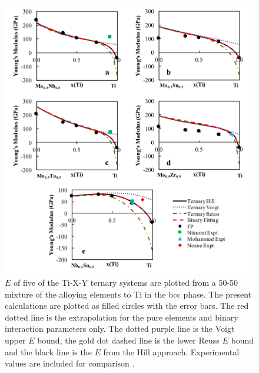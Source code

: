 \pagebreak
\begin{figure}[H]
	\centering
	\includegraphics[width=\textwidth]{Chapter-6/Figures/tixyyoungs1.png}
	\caption{$E$ of five of the Ti-X-Y ternary systems are plotted from a 50-50 mixture of the alloying elements to Ti in the bcc phase. The present calculations are plotted as filled circles with the error bars. The red dotted line is the extrapolation for the pure elements and binary interaction parameters only. The dotted purple line is the Voigt upper $E$ bound, the gold dot dashed line is the lower Reuss $E$ bound and the black line is the $E$ from the Hill approach. Experimental values are included for comparison \cite{Niinomi2012,Mohammed2014,Nozoe2007,Geetha2009}.}
	\label{Ch6-figure:tixyyoungs1}
\end{figure}

